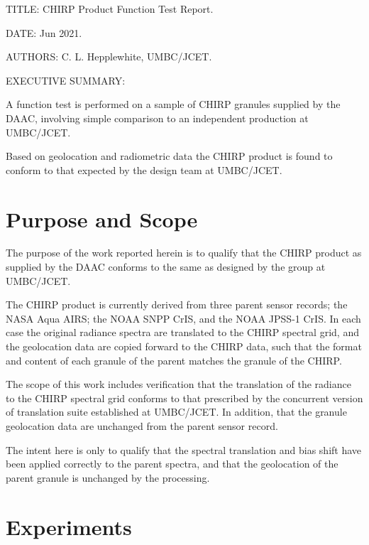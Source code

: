 \documentclass[11pt]{article}
\author{chris hepplewhite}
\date{\today}
\title{}
\begin{document}
\tableofcontents

\begin{titlepage}
 
TITLE: CHIRP Product Function Test Report.

DATE: Jun 2021.

AUTHORS: C. L. Hepplewhite, UMBC/JCET.

EXECUTIVE SUMMARY:

A function test is performed on a sample of CHIRP granules supplied by the DAAC,
involving simple comparison to an independent production at UMBC/JCET.

Based on geolocation and radiometric data the CHIRP product is found to conform to
that expected by the design team at UMBC/JCET.

\end{titlepage}


\section{Purpose and Scope}
\label{sec:org1488f7b}

The purpose of the work reported herein is to qualify that the CHIRP product as supplied
by the DAAC conforms to the same as designed by the group at UMBC/JCET.

The CHIRP product is currently derived from three parent sensor records; the NASA Aqua AIRS; the
NOAA SNPP CrIS, and the NOAA JPSS-1 CrIS. In each case the original radiance spectra are 
translated to the CHIRP spectral grid, and the geolocation data are copied forward to the
CHIRP data, such that the format and content of each granule of the parent matches the granule
of the CHIRP.

The scope of this work includes verification that the translation of the radiance to the
CHIRP spectral grid conforms to that prescribed by the concurrent version of translation
suite established at UMBC/JCET. In addition, that the granule geolocation data are unchanged
from the parent sensor record.

The intent here is only to qualify that the spectral translation and bias shift have been
applied correctly to the parent spectra, and that the geolocation of the parent granule
is unchanged by the processing.


\section{Experiments}
\label{sec:org0e598df}
\end{document}
